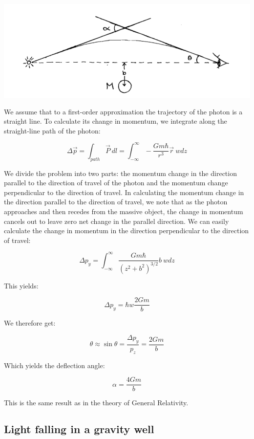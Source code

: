 \documentclass {article}
\begin{document}
\begin{center}
	\includegraphics[scale=0.4]{light-bending.png}
\end{center}


We assume that to a first-order approximation the trajectory of the photon is a straight line. To calculate its change in momentum, we integrate along the straight-line path of the photon:

$$\Delta \vec p = \int_{path} \vec P ~ dl = \int_{-\infty}^{\infty} - \frac {Gm\hbar}{r^3} \vec r ~ wdz $$

We divide the problem into two parts: the momentum change in the direction parallel to the direction of travel of the photon and the momentum change perpendicular to the direction of travel. In calculating the momentum change in the direction parallel to the direction of travel, we note that as the photon approaches and then recedes from the massive object, the change in momentum cancels out to leave zero net change in the parallel direction. We can easily calculate the change in momentum in the direction perpendicular to the direction of travel:

$$\Delta p_y = \int_{-\infty}^{\infty}  \frac {Gm\hbar}{(z^2 + b^2)^{3/2}} b ~ wdz $$

This yields:

$$\Delta p_y = \hbar w \frac {2Gm} b$$

We therefore get:

$$\theta \approx \sin \theta = \frac {\Delta p_y}{p_z} = \frac {2Gm} b$$

Which yields the deflection angle:

$$\alpha = \frac {4Gm} b$$

This is the same result as in the theory of General Relativity.

\newpage
\subsection{Light falling in a gravity well}
\end{document}
